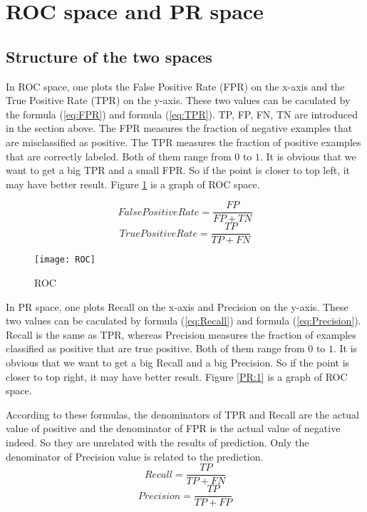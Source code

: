 \documentclass[a4paper,12pt]{article}
\begin{document}
\section{ROC space and PR space}

\subsection{Structure of the two spaces}
In ROC space, one plots the False Positive Rate (FPR) on the x-axis and the True Positive Rate (TPR) on the y-axis. These two values can be caculated by the formula (\ref{eq:FPR}) and formula (\ref{eq:TPR}). TP, FP, FN, TN are introduced in the section above. The FPR measures the fraction of negative examples that are misclassified as positive. The TPR measures the fraction of positive examples that are correctly labeled. Both of them range from $0$ to $1$. It is obvious that we want to get a big TPR and a small FPR. So if the point is closer to top left, it may have better result. Figure \ref{ROC:1} is a graph of ROC space.

\begin{equation}\label{eq:FPR}
FalsePositiveRate=\frac{FP}{FP+TN}
\end{equation}
\begin{equation}\label{eq:TPR}
TruePositiveRate=\frac{TP}{TP+FN}
\end{equation}

\begin{figure}[!ht]
\centering\texttt{[image: ROC]}
\caption{ROC}\label{ROC:1}
\end{figure} 

In PR space, one plots Recall on the x-axis and Precision on the y-axis. These two values can be caculated by formula (\ref{eq:Recall}) and formula (\ref{eq:Precision}). Recall is the same as TPR, whereas Precision measures the fraction of examples classified as positive that are true positive. Both of them range from $0$ to $1$. It is obvious that we want to get a big Recall and a big Precision. So if the point is closer to top right, it may have better result. Figure \ref{PR:1} is a graph of ROC space.

According to these formulas, the denominators of TPR and Recall are the actual value of positive and the denominator of FPR is the actual value of negative indeed. So they are unrelated with the results of prediction. Only the denominator of Precision value is related to the prediction.
\begin{equation}\label{eq:Recall}
Recall=\frac{TP}{TP+FN}
\end{equation}
\begin{equation}\label{eq:Precision}
Precision=\frac{TP}{TP+FP}
\end{equation}
\end{document}
